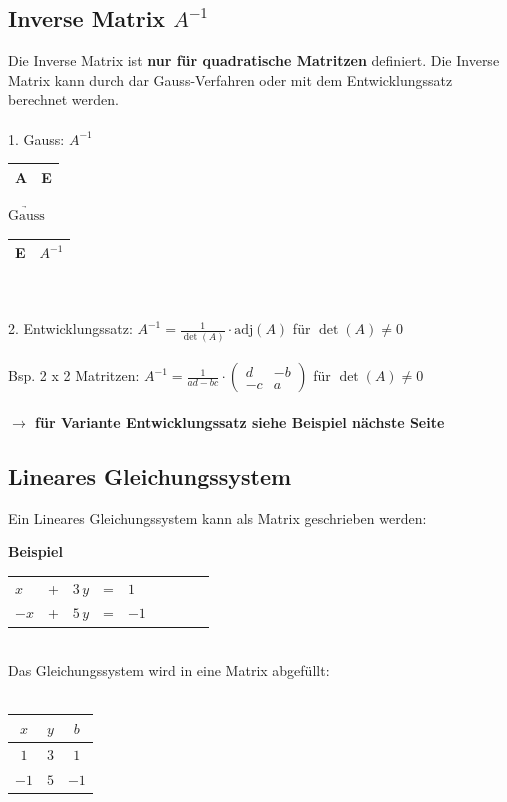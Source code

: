 		    \subsection{Inverse Matrix $A^{-1}$}
		    Die Inverse Matrix ist \textbf{nur für quadratische Matritzen} definiert.
		    Die Inverse Matrix kann durch dar Gauss-Verfahren oder mit dem Entwicklungssatz berechnet werden. \\
		    \\
		    1. Gauss: \quad $A^{-1}$ \quad \begin{tabular}{|c|c|}
		    					\hline
		    					A & E \\
		    					\hline
		    					\end{tabular} \quad $\underrightarrow{\text{Gauss}}$ \quad \begin{tabular}{|c|c|}
		    					\hline
		    					E & $A^{-1}$ \\
		    					\hline
		    					\end{tabular} \\
					\\
			2. Entwicklungssatz: \quad $A^{-1} = \frac{1}{\det(A)} \cdot \mathrm{adj}(A) $  für $\det(A) \neq 0$ \\
			\\
			Bsp. 2 x 2 Matritzen: \quad $A^{-1} = \frac{1}{ad-bc} \cdot \begin{pmatrix}
			d & -b \\
			-c & a 
			\end{pmatrix} $  für $\det(A) \neq 0$ \\
			\\
			\textbf{$\rightarrow$ für Variante Entwicklungssatz siehe Beispiel nächste Seite} \\
			

			\subsection{Lineares Gleichungssystem }
			 Ein Lineares Gleichungssystem kann als Matrix geschrieben werden:
			 
			 \textbf{Beispiel}\\
			 \begin{tabular}{llllll |c c | c|}
			 $x$ & + & $3 \, y$ & = & $1$  \\
			 $-x$ & + & $5 \, y$ & = & $-1$  \\
			 \end{tabular} 
			\\
			 
			Das Gleichungssystem wird in eine Matrix abgefüllt: \\
			\\
			 \begin{tabular}[h]{|c c | c|}
			 \hline
			 $x$ & $y$ & $b$\\
			 \hline
			 $1$ & $3$ & $1$ \\
			 $-1$ & $5$ & $-1$ \\
			 \hline
			 \end{tabular}
			 
